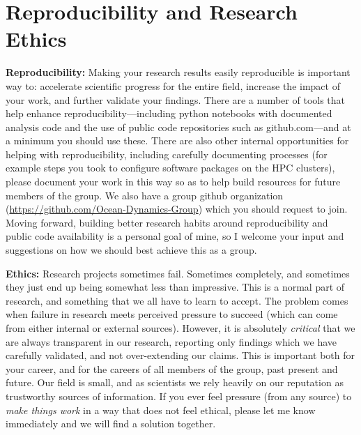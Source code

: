 \documentclass{classassignments}
\begin{document}
\section{Reproducibility and Research Ethics}
\textbf{Reproducibility:} Making your research results easily reproducible is important way to: accelerate scientific progress for the entire field, increase the impact of your work, and further validate your findings. There are a number of tools that help enhance reproducibility---including python notebooks with documented analysis code and the use of public code repositories such as github.com---and at a minimum you should use these. There are also other internal opportunities for helping with reproducibility, including carefully documenting processes (for example steps you took to configure software packages on the HPC clusters), please document your work in this way so as to help build resources for future members of the group. We also have a group github organization (\url{https://github.com/Ocean-Dynamics-Group}) which you should request to join. Moving forward, building better research habits around reproducibility and public code availability is a personal goal of mine, so I welcome your input and suggestions on how we should best achieve this as a group.\bigskip

\noindent\textbf{Ethics:} Research projects sometimes fail. Sometimes completely, and sometimes they just end up being somewhat less than impressive. This is a normal part of research, and something that we all have to learn to accept. The problem comes when failure in research meets perceived pressure to succeed (which can come from either internal or external sources). However, it is absolutely \textit{critical} that we are always transparent in our research, reporting only findings which we have carefully validated, and not over-extending our claims. This is important both for your career, and for the careers of all members of the group, past present and future. Our field is small, and as scientists we rely heavily on our reputation as trustworthy sources of information. If you ever feel pressure (from any source) to \textit{make things work} in a way that does not feel ethical, please let me know immediately and we will find a solution together.\bigskip
\end{document}
